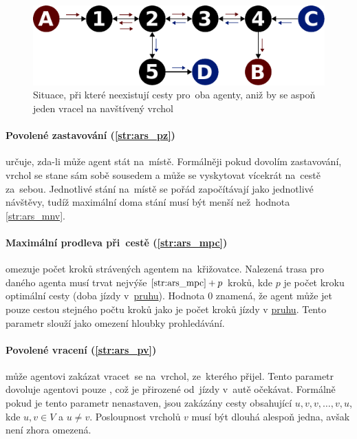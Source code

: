 \begin{figure}[h]
	\centering
	\includegraphics[width=140mm]{../img/mnv_example}
	\caption{Situace, při které neexistují cesty pro~oba agenty, aniž by se aspoň jeden vracel na navštívený vrchol}
	\label{fig:ars_mnv_example}
\end{figure}

\paragraph{Povolené zastavování (\ref{str:ars_pz})}
určuje, zda-li může agent stát na~místě.
Formálněji pokud dovolím zastavování, vrchol se stane sám sobě sousedem a může se vyskytovat vícekrát na~cestě za~sebou.
Jednotlivé stání na~místě se pořád započítávají jako jednotlivé návštěvy,
tudíž maximální doma stání musí být menší než~hodnota \ref{str:ars_mnv}.

\paragraph{Maximální prodleva při~cestě (\ref{str:ars_mpc})}
omezuje počet kroků strávených agentem na~křižovatce.
Nalezená trasa pro daného agenta musí trvat nejvýše $\ref{str:ars_mpc} + p$ kroků,
kde $p$ je počet kroku optimální cesty (doba jízdy v~\hyperref[par:pruh]{pruhu}).
Hodnota $0$ znamená, že agent může jet pouze cestou stejného počtu kroků
jako je počet kroků jízdy v \hyperref[par:pruh]{pruhu}.
Tento parametr slouží jako omezení hloubky prohledávání.

\paragraph{Povolené vracení (\ref{str:ars_pv})}
může agentovi zakázat vracet~se na~vrchol, ze~kterého přijel.
Tento parametr dovoluje agentovi pouze , což je přirozené od~jízdy v~autě očekávat.
Formálně pokud je tento parametr nenastaven, jsou zakázány cesty obsahující $u,v,v,\dots,v,u$,
kde $u, v \in V$ a $u \neq v$.
Posloupnost vrcholů $v$ musí být dlouhá alespoň jedna, avšak není zhora omezená.


